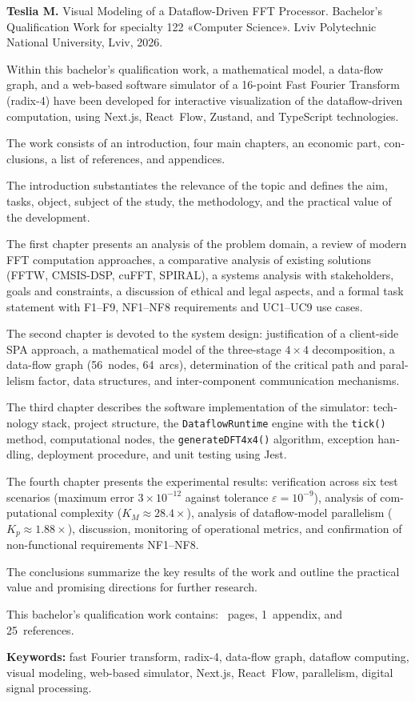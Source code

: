 \begin{otherlanguage}{english}
\textbf{Teslia M.} Visual Modeling of a Dataflow-Driven FFT Processor.
Bachelor's Qualification Work for specialty 122 «Computer Science».
Lviv Polytechnic National University, Lviv, 2026.

Within this bachelor's qualification work, a mathematical model, a
data-flow graph, and a web-based software simulator of a 16-point
Fast Fourier Transform (radix-4) have been developed for interactive
visualization of the dataflow-driven computation, using Next.js,
React~Flow, Zustand, and TypeScript technologies.

The work consists of an introduction, four main chapters, an economic
part, conclusions, a list of references, and appendices.

The introduction substantiates the relevance of the topic and defines
the aim, tasks, object, subject of the study, the methodology, and
the practical value of the development.

The first chapter presents an analysis of the problem domain, a
review of modern FFT computation approaches, a comparative analysis
of existing solutions (FFTW, CMSIS-DSP, cuFFT, SPIRAL), a systems
analysis with stakeholders, goals and constraints, a discussion of
ethical and legal aspects, and a formal task statement with F1--F9,
NF1--NF8 requirements and UC1--UC9 use cases.

The second chapter is devoted to the system design: justification of
a client-side SPA approach, a mathematical model of the three-stage
$4\times4$ decomposition, a data-flow graph (56~nodes, 64~arcs),
determination of the critical path and parallelism factor, data
structures, and inter-component communication mechanisms.

The third chapter describes the software implementation of the
simulator: technology stack, project structure, the
\texttt{DataflowRuntime} engine with the \texttt{tick()} method,
computational nodes, the \texttt{generateDFT4x4()} algorithm,
exception handling, deployment procedure, and unit testing using Jest.

The fourth chapter presents the experimental results: verification
across six test scenarios (maximum error $3\times10^{-12}$ against
tolerance $\varepsilon=10^{-9}$), analysis of computational complexity
($K_M\approx28.4\times$), analysis of dataflow-model parallelism
($K_p\approx1.88\times$), discussion, monitoring of operational
metrics, and confirmation of non-functional requirements NF1--NF8.

The conclusions summarize the key results of the work and outline
the practical value and promising directions for further research.

This bachelor's qualification work contains: \pageref{LastPage}~pages,
1~appendix, and 25~references.

\textbf{Keywords:} fast Fourier transform, radix-4, data-flow graph,
dataflow computing, visual modeling, web-based simulator, Next.js,
React~Flow, parallelism, digital signal processing.
\end{otherlanguage}
